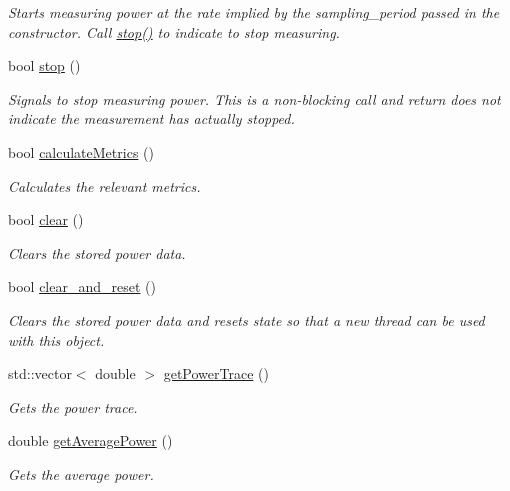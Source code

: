 \begin{DoxyCompactItemize}
\begin{DoxyCompactList}\small\item\em Starts measuring power at the rate implied by the sampling\-\_\-period passed in the constructor. Call \hyperlink{classxmem_1_1power_1_1_power_reader_a5c28efc4aece34a5469d067a133920f4}{stop()} to indicate to stop measuring. \end{DoxyCompactList}\item 
bool \hyperlink{classxmem_1_1power_1_1_power_reader_a5c28efc4aece34a5469d067a133920f4}{stop} ()
\begin{DoxyCompactList}\small\item\em Signals to stop measuring power. This is a non-\/blocking call and return does not indicate the measurement has actually stopped. \end{DoxyCompactList}\item 
bool \hyperlink{classxmem_1_1power_1_1_power_reader_a953d6b42a83c8c0b709aa49b994c6803}{calculate\-Metrics} ()
\begin{DoxyCompactList}\small\item\em Calculates the relevant metrics. \end{DoxyCompactList}\item 
bool \hyperlink{classxmem_1_1power_1_1_power_reader_a17b206d91ad607dc6fbcd4f2e0f66684}{clear} ()
\begin{DoxyCompactList}\small\item\em Clears the stored power data. \end{DoxyCompactList}\item 
bool \hyperlink{classxmem_1_1power_1_1_power_reader_a6377973eed59cd99bcb475c17e5cb0f2}{clear\-\_\-and\-\_\-reset} ()
\begin{DoxyCompactList}\small\item\em Clears the stored power data and resets state so that a new thread can be used with this object. \end{DoxyCompactList}\item 
std\-::vector$<$ double $>$ \hyperlink{classxmem_1_1power_1_1_power_reader_af41f0300055c2ec45785cc4e77864a7d}{get\-Power\-Trace} ()
\begin{DoxyCompactList}\small\item\em Gets the power trace. \end{DoxyCompactList}\item 
double \hyperlink{classxmem_1_1power_1_1_power_reader_a2b20b7e6a22dad732cdb166d90fcfe98}{get\-Average\-Power} ()
\begin{DoxyCompactList}\small\item\em Gets the average power. \end{DoxyCompactList}\item 

\end{DoxyCompactItemize}
